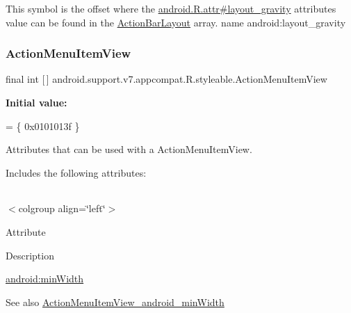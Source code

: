 This symbol is the offset where the \hyperlink{}{android.\+R.\+attr\#layout\+\_\+gravity} attribute\textquotesingle{}s value can be found in the \hyperlink{classandroid_1_1support_1_1v7_1_1appcompat_1_1R_1_1styleable_a130715398cd11a55fefd1a376c18092e}{Action\+Bar\+Layout} array.  name android\+:layout\+\_\+gravity \mbox{\label{classandroid_1_1support_1_1v7_1_1appcompat_1_1R_1_1styleable_a289a3ec3805aee2d895cf1061f6f50dd}} 
\subsubsection{\texorpdfstring{Action\+Menu\+Item\+View}{ActionMenuItemView}}
{\footnotesize\ttfamily final int \mbox{[}$\,$\mbox{]} android.\+support.\+v7.\+appcompat.\+R.\+styleable.\+Action\+Menu\+Item\+View\hspace{0.3cm}{\ttfamily [static]}}

{\bfseries Initial value\+:}
\begin{DoxyCode}
= \{
            0x0101013f
        \}
\end{DoxyCode}
Attributes that can be used with a Action\+Menu\+Item\+View. 

Includes the following attributes\+:

\tabulinesep=1mm
\begin{longtabu} spread 0pt [c]{*{0}{|X[-1]}|}
\hline
\end{longtabu}
$<$colgroup align=\char`\"{}left\char`\"{}$>$ 

Attribute

Description 

{\ttfamily \hyperlink{classandroid_1_1support_1_1v7_1_1appcompat_1_1R_1_1styleable_aad3bfe260dfb0908355a6cf15f98819e}{android\+:min\+Width}}

\begin{DoxySeeAlso}{See also}
\hyperlink{classandroid_1_1support_1_1v7_1_1appcompat_1_1R_1_1styleable_aad3bfe260dfb0908355a6cf15f98819e}{Action\+Menu\+Item\+View\+\_\+android\+\_\+min\+Width} 
\end{DoxySeeAlso}
\mbox{\label{classandroid_1_1support_1_1v7_1_1appcompat_1_1R_1_1styleable_aad3bfe260dfb0908355a6cf15f98819e}} 

